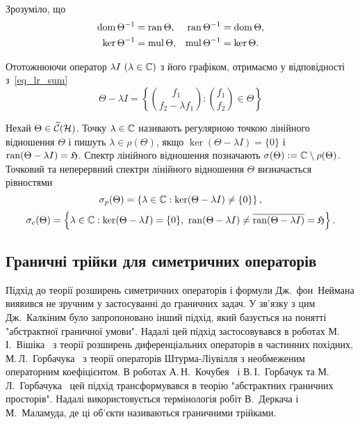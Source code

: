Зрозуміло, що 
\begin{align*}
	\operatorname{dom}{\Theta^{-1}} &= \operatorname{ran}{\Theta}, & \operatorname{ran}{\Theta^{-1}} &= \operatorname{dom}{\Theta},\\
	\ker{\Theta^{-1}} &= \operatorname{mul}{\Theta}, & \operatorname{mul}{\Theta^{-1}} &= \ker{\Theta}.
\end{align*}

Ототожнюючи оператор $\lambda I\ (\lambda\in\bbC)$ з його графіком, отримаємо у відповідності з~\eqref{eq_lr_sum}
\begin{equation}
	\Theta-\lambda I=\left\{ \binom{f_1}{f_2-\lambda f_1} : \binom{f_1}{f_2}\in\Theta\right\}
\end{equation}

\begin{definition}
	Нехай $\Theta \in \widetilde{\mathcal{C}}(\mathcal{H})$. Точку $\lambda \in \mathbb{C}$ називають регулярною точкою лінійного відношення $\Theta$ і пишуть $\lambda\in\rho(\Theta)$, якщо $\ker(\Theta-\lambda I) = \{0\}$ і $\operatorname{ran} (\Theta-\lambda I) = \mathfrak{H}$. Спектр лінійного відношення позначають $\sigma(\Theta):=\mathbb{C}\setminus\rho(\Theta)$. Точковий та неперервний спектри лінійного відношення $\Theta$ визначається рівностями
	\begin{equation*}
		\sigma_p(\Theta) = \left\{\lambda\in\mathbb{C}:\ker(\Theta-\lambda I)\ne \{0\} \right\},
	\end{equation*}
	\begin{equation*}
		\sigma_c(\Theta) = \left\{\lambda\in\mathbb{C}: \ker(\Theta-\lambda I)=\{0\},\ \operatorname{ran}(\Theta-\lambda I) \ne \overline{\operatorname{ran} (\Theta-\lambda I)} = \mathfrak{H} \right\}.
	\end{equation*}
\end{definition}




\subsection{Граничні трійки для симетричних операторів} %

Підхід до теорії розширень симетричних операторів і формули Дж.~фон~Неймана виявився не зручним у застосуванні до граничних задач. У зв'язку з цим Дж.~Калкіним було запропоновано інший підхід, який базується на понятті "абстрактної граничної умови".
Надалі цей підхід застосовувався в роботах М.\,І.~Вішіка~\cite{Visik1952} з теорії розширень диференціальних операторів в частинних похідних, М.\,Л.~Горбачука~\cite{Horb1971} з теорії операторів Штурма-Ліувілля з необмеженим операторним коефіцієнтом.
В роботах А.\,Н.~Кочубея~\cite{Koch1975} і В.\,І.~Горбачук та М.\,Л.~Горбачука~\cite{Gorb1991} цей підхід трансформувався в теорію "абстрактних граничних просторів". Надалі використовується термінологія робіт В.~Деркача і М.~Маламуда, де ці об'єкти називаються граничними трійками.


